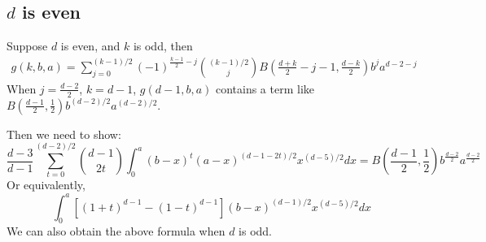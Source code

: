 \documentclass{article}
\begin{document}
\subsection{$d$ is even}
Suppose $d$ is even, and $k$ is odd, then
\begin{align*}
    g(k,b,a)= \sum_{j=0}^{(k-1)/2}
    (-1)^{\frac{k-1}{2}-j}\binom{(k-1)/2}{j}
    B(\frac{d+k}{2}-j-1, \frac{d-k}{2})
    b^j a^{d-2-j}
\end{align*}
When $j=\frac{d-2}{2}$, $k=d-1$,
$g(d-1,b,a)$
contains a term like
$B(\frac{d-1}{2}, \frac{1}{2})b^{(d-2)/2}
a^{(d-2)/2}$.

Then we need to show:
\begin{equation*}
 \frac{d-3}{d-1} \sum_{t=0}^{(d-2)/2}
\binom{d-1}{2t} \int_0^a
(b-x)^{t}(a-x)^{(d-1-2t)/2}
x^{(d-5)/2} dx
=B(\frac{d-1}{2}, \frac{1}{2})
b^{\frac{d-2}{2}}
a^{\frac{d-2}{2}}
\end{equation*}
Or equivalently,
\begin{equation*}
    \int_0^a[(1+t)^{d-1}-(1-t)^{d-1}] (b-x)^{(d-1)/2}x^{(d-5)/2} dx
\end{equation*}
We can also obtain the above formula when $d$ is odd.
\end{document}

